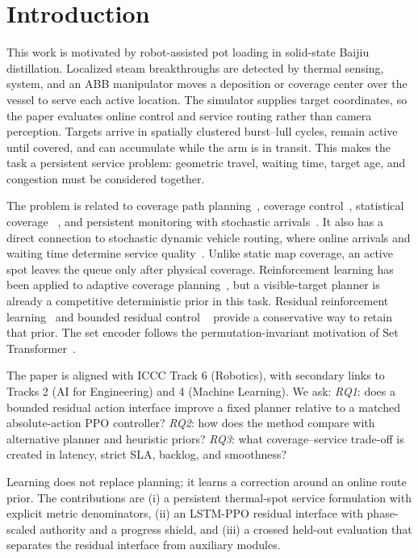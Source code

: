 \documentclass[conference]{IEEEtran}
\begin{document}
\section{Introduction}
This work is motivated by robot-assisted pot loading in solid-state Baijiu
distillation. Localized steam breakthroughs are detected by thermal sensing,
system, and an ABB manipulator moves a deposition or coverage center over the
vessel to serve each active location. The simulator supplies target
coordinates, so the paper evaluates online control and service routing rather
than camera perception. Targets arrive in spatially clustered burst--lull
cycles, remain active until covered, and can accumulate while the arm is in
transit. This makes the task a persistent service problem: geometric travel,
waiting time, target age, and congestion must be considered together.

The problem is related to coverage path planning~\cite{galceran2013survey},
coverage control~\cite{cortes2004coverage}, statistical coverage
~\cite{arslan2019statistical}, and persistent monitoring with stochastic
arrivals~\cite{yu2015persistent}. It also has a direct connection to
stochastic dynamic vehicle routing, where online arrivals and waiting time
determine service quality~\cite{bertsimas1991stochastic,bertsimas1993multiple}.
Unlike static map coverage, an active spot leaves the queue only after physical
coverage. Reinforcement learning has been applied to adaptive coverage
planning~\cite{carvalho2025zeroshot,champagnie2024online}, but a visible-target
planner is already a competitive deterministic prior in this task. Residual reinforcement
learning~\cite{johannink2019residual} and bounded residual control
~\cite{yan2025ictrl,zhang2023robodact} provide a conservative way to retain
that prior. The set encoder follows the permutation-invariant motivation of
Set Transformer~\cite{lee2019settransformer}.

The paper is aligned with ICCC Track 6 (Robotics), with secondary links to
Tracks 2 (AI for Engineering) and 4 (Machine Learning). We ask:
\emph{RQ1}: does a bounded residual action interface improve a fixed planner
relative to a matched absolute-action PPO controller? \emph{RQ2}: how does
the method compare with alternative planner and heuristic priors? \emph{RQ3}:
what coverage--service trade-off is created in latency, strict SLA, backlog,
and smoothness?

Learning does not replace planning; it learns a correction around an online
route prior. The contributions are (i) a persistent thermal-spot service
formulation with explicit metric denominators, (ii) an LSTM-PPO residual
interface with phase-scaled authority and a progress shield, and (iii) a
crossed held-out evaluation that separates the residual interface from
auxiliary modules.
\end{document}
